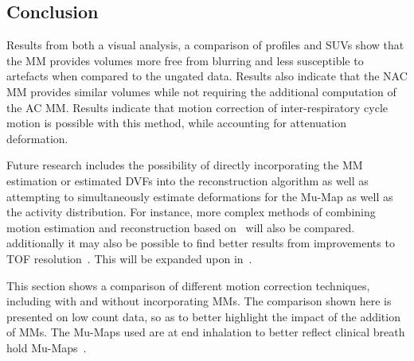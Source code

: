         \subsection{Conclusion} \label{sec:pet_ct_respiratory_motion_correction_with_a_single_attenuation_map_using_nAC_derived_deformation_fields_conclusion}
            Results from both a visual analysis, a comparison of profiles and \glspl{SUV} show that the \gls{MM} provides volumes more free from blurring and less susceptible to artefacts when compared to the ungated data. Results also indicate that the \gls{NAC} \gls{MM} provides similar volumes while not requiring the additional computation of the \gls{AC} \gls{MM}. Results indicate that motion correction of inter-respiratory cycle motion is possible with this method, while accounting for attenuation deformation.
            
            Future research includes the possibility of directly incorporating the \gls{MM} estimation or estimated \glspl{DVF} into the reconstruction algorithm as well as  attempting to simultaneously estimate deformations for the \gls{Mu-Map} as well as the activity distribution. For instance, more complex methods of combining motion estimation and reconstruction based on~\parencite{Bousse2016a, Bousse2016} will also be compared. additionally it may also be possible to find better results from improvements to \gls{TOF} resolution~\parencite{Nikos2019, Efthimiou2017, efth2016}. This will be expanded upon in~.
    
        This section shows a comparison of different motion correction techniques, including with and without incorporating \glspl{MM}. The comparison shown here is presented on low count data, so as to better highlight the impact of the addition of \glspl{MM}. The \glspl{Mu-Map} used are at end inhalation to better reflect clinical breath hold \glspl{Mu-Map}~\parencite{Whitehead2021ComparisonMap}.
        
